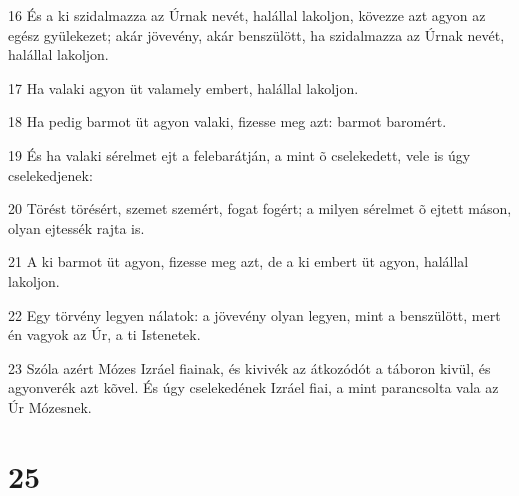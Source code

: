 \par 16 És a ki szidalmazza az Úrnak nevét, halállal lakoljon, kövezze azt agyon az egész gyülekezet; akár jövevény, akár benszülött, ha szidalmazza az Úrnak nevét, halállal lakoljon.
\par 17 Ha valaki agyon üt valamely embert, halállal lakoljon.
\par 18 Ha pedig barmot üt agyon valaki, fizesse meg azt: barmot baromért.
\par 19 És ha valaki sérelmet ejt a felebarátján, a mint õ cselekedett, vele is úgy cselekedjenek:
\par 20 Törést törésért, szemet szemért, fogat fogért; a milyen sérelmet õ ejtett máson, olyan ejtessék rajta is.
\par 21 A ki barmot üt agyon, fizesse meg azt, de a ki embert üt agyon, halállal lakoljon.
\par 22 Egy törvény legyen nálatok: a jövevény olyan legyen, mint a benszülött, mert én vagyok az Úr, a ti Istenetek.
\par 23 Szóla azért Mózes Izráel fiainak, és kivivék az átkozódót a táboron kivül, és agyonverék azt kõvel. És úgy cselekedének Izráel fiai, a mint parancsolta vala az Úr Mózesnek.

\chapter{25}

